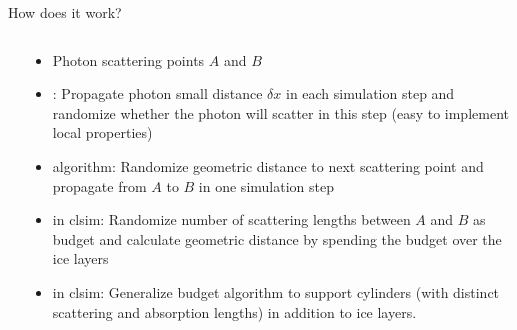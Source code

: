 
\begin{frame}[fragile]{How does it work?}

  \begin{columns}
    \begin{column}{0.5\textwidth}
    \end{column}
    \begin{column}{0.5\textwidth}

      \begin{itemize}
        \item Photon scattering points $A$ and $B$
        \item<1> : Propagate photon small distance $\delta x$ in each simulation step and randomize whether the photon will scatter in this step (easy to implement local properties)
        \item<2>  algorithm: Randomize geometric distance to next scattering point and propagate from $A$ to $B$ in one simulation step
        \item<3>  in clsim: Randomize number of scattering lengths between $A$ and $B$ as budget and calculate geometric distance by spending the budget over the ice layers
        \item<4>  in clsim: Generalize budget algorithm to support cylinders (with distinct scattering and absorption lengths) in addition to ice layers.
      \end{itemize}

    \end{column}
  \end{columns}

\end{frame}